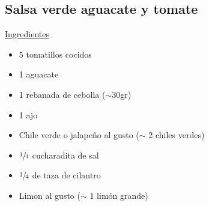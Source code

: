 \subsection{Salsa verde aguacate y tomate}

\underline{Ingredientes}

\begin{itemize}
\item 5 tomatillos cocidos
\item 1 aguacate
\item 1 rebanada de cebolla ($\sim$30gr)
\item 1 ajo
\item Chile verde o jalapeño al gusto ($\sim$ 2 chiles verdes)
\item $\sfrac{1}{4}$ cucharadita de sal
\item $\sfrac{1}{4}$ de taza de cilantro
\item Limon al gusto ($\sim$ 1 lim\'on grande)
\end{itemize}
